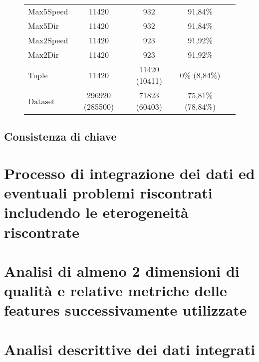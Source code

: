 \begin{figure}[H]
\begin{tabular}{lcccc}
		Max5Speed	 &              11420  & 932             & 91,84\% \\ 
		Max5Dir	 	&               11420 &  932             & 91,84\% \\
		Max2Speed	 &              11420  & 923             & 91,92\% \\
		Max2Dir		 &              11420  & 923             & 91,92\% \\
		\midrule
		Tuple 		&				11420  &	11420 (10411)			   & 0\% (8,84\%)\\
		Dataset  	&	   296920 (285500)  &	71823 (60403) 		   & 75,81\% (78,84\%)\\
	\end{tabular}
	\label{tab:completezza weather from Apr 2007 to 2017}
\end{figure}





\subsection{Consistenza di chiave}




\section{Processo di integrazione dei dati ed eventuali problemi riscontrati includendo le eterogeneità riscontrate}
\section{Analisi di almeno 2 dimensioni di qualità e relative metriche delle features successivamente utilizzate}
\section{Analisi descrittive dei dati integrati}
